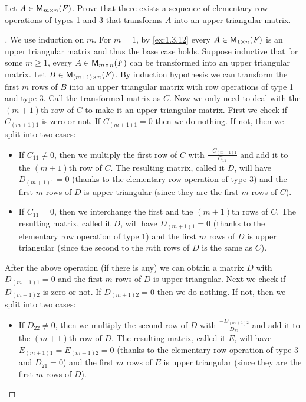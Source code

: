 \begin{ex}\label{ex:3.1.12}
	Let \(A \in \mathsf{M}_{{m} \times n}({\mathit{F}})\).
	Prove that there exists a sequence of elementary row operations of types 1 and 3 that transforms \(A\) into an upper triangular matrix.
\end{ex}

\begin{proof}[]
	We use induction on \(m\).
	For \(m = 1\), by \cref{ex:1.3.12} every \(A \in \mathsf{M}_{{1} \times n}({\mathit{F}})\) is an upper triangular matrix and thus the base case holds.
	Suppose inductive that for some \(m \geq 1\), every \(A \in \mathsf{M}_{{m} \times n}({\mathit{F}})\) can be transformed into an upper triangular matrix.
	Let \(B \in \mathsf{M}_{{(m + 1)} \times n}({\mathit{F}})\).
	By induction hypothesis we can transform the first \(m\) rows of \(B\) into an upper triangular matrix with row operations of type 1 and type 3.
	Call the transformed matrix as \(C\).
	Now we only need to deal with the \((m + 1)\)th row of \(C\) to make it an upper triangular matrix.
	First we check if \(C_{(m + 1) 1}\) is zero or not.
	If \(C_{(m + 1) 1} = 0\) then we do nothing.
	If not, then we split into two cases:
	\begin{itemize}
		\item If \(C_{1 1} \neq 0\), then we multiply the first row of \(C\) with \(\frac{-C_{(m + 1) 1}}{C_{1 1}}\) and add it to the \((m + 1)\)th row of \(C\).
		      The resulting matrix, called it \(D\), will have \(D_{(m + 1) 1} = 0\) (thanks to the elementary row operation of type 3) and the first \(m\) rows of \(D\) is upper triangular (since they are the first \(m\) rows of \(C\)).
		\item If \(C_{1 1} = 0\), then we interchange the first and the \((m + 1)\)th rows of \(C\).
		      The resulting matrix, called it \(D\), will have \(D_{(m + 1) 1} = 0\) (thanks to the elementary row operation of type 1) and the first \(m\) rows of \(D\) is upper triangular (since the second to the \(m\)th rows of \(D\) is the same as \(C\)).
	\end{itemize}
	After the above operation (if there is any) we can obtain a matrix \(D\) with \(D_{(m + 1) 1} = 0\) and the first \(m\) rows of \(D\) is upper triangular.
	Next we check if \(D_{(m + 1) 2}\) is zero or not.
	If \(D_{(m + 1) 2} = 0\) then we do nothing.
	If not, then we split into two cases:
	\begin{itemize}
		\item If \(D_{2 2} \neq 0\), then we multiply the second row of \(D\) with \(\frac{-D_{(m + 1) 2}}{D_{2 2}}\) and add it to the \((m + 1)\)th row of \(D\).
		      The resulting matrix, called it \(E\), will have \(E_{(m + 1) 1} = E_{(m + 1) 2} = 0\) (thanks to the elementary row operation of type 3 and \(D_{2 1} = 0\)) and the first \(m\) rows of \(E\) is upper triangular (since they are the first \(m\) rows of \(D\)).

\end{itemize}
\end{proof}
